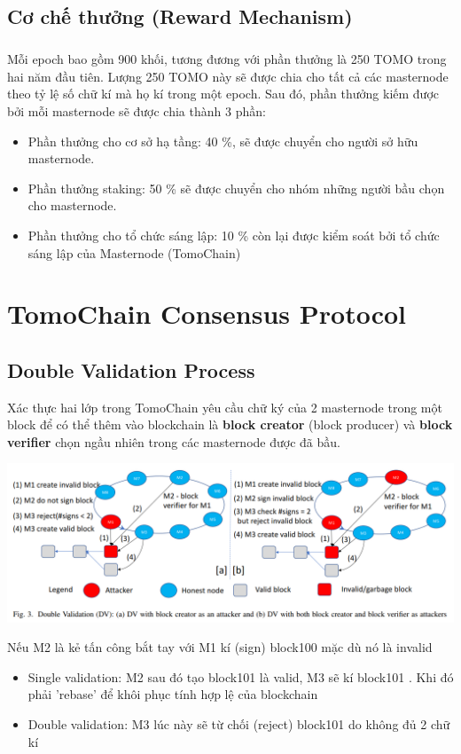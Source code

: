 \documentclass[12pt,a4paper]{article}
\begin{document}
	\subsection{Cơ chế thưởng (Reward Mechanism)}
		\subparagraph{} Mỗi epoch bao gồm 900 khối, tương đương với phần thưởng là 250 TOMO trong hai năm đầu tiên. Lượng 250 TOMO này sẽ được chia cho tất cả các masternode theo tỷ lệ số chữ kí mà họ kí trong một epoch. Sau đó, phần thưởng kiếm được bởi mỗi masternode sẽ được chia thành 3 phần:
		 \begin{itemize}		
			\item Phần thưởng cho cơ sở hạ tầng: 40 \%, sẽ được chuyển cho người sở hữu masternode.
			\item Phần thưởng staking: 50 \% sẽ được chuyển cho nhóm những người bầu chọn cho masternode.
			\item Phần thưởng cho tổ chức sáng lập: 10 \% còn lại được kiểm soát bởi tổ chức sáng lập của Masternode (TomoChain)
		\end{itemize}
		
	
	\section{TomoChain Consensus Protocol}
		\subsection{Double Validation Process}
		Xác thực hai lớp trong TomoChain yêu cầu chữ ký của 2 masternode trong một block để có thể thêm vào blockchain là \textbf{block creator} (block producer) và \textbf{block verifier} chọn ngầu nhiên trong các masternode được đã bầu.  
		\begin{center}
			\includegraphics[width=\linewidth]{DV.png} 
		\end{center}
		Nếu M2 là kẻ tấn công bắt tay với M1 kí  (sign) block100 mặc dù nó là invalid
		\begin{itemize}		
			\item Single validation: M2 sau đó  tạo block101 là valid, M3 sẽ kí block101 . Khi đó phải 'rebase' để khôi phục tính hợp lệ của blockchain 
			\item Double validation: M3 lúc này sẽ từ chối (reject) block101 do không đủ 2 chữ kí
		\end{itemize}
\end{document}
